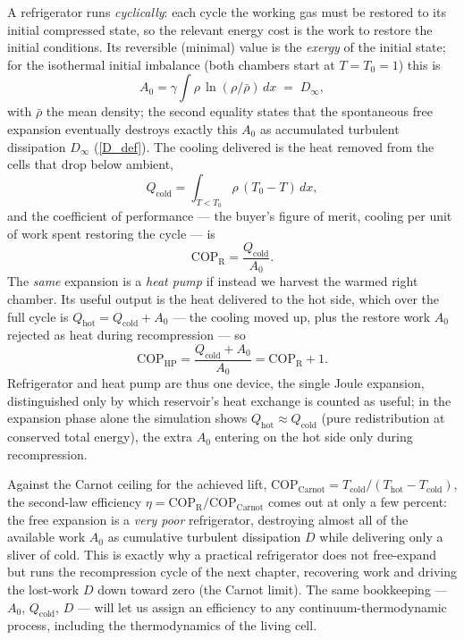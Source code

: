 A refrigerator runs \emph{cyclically}: each cycle the working gas must be
restored to its initial compressed state, so the relevant energy cost is the
work to restore the initial conditions. Its reversible (minimal) value is the
\emph{exergy} of the initial state; for the isothermal initial imbalance (both
chambers start at $T=T_0=1$) this is
\begin{equation}\label{exergyA0}
A_0=\gamma\int \rho\,\ln(\rho/\bar\rho)\,dx \;=\; D_\infty ,
\end{equation}
with $\bar\rho$ the mean density; the second equality states that the spontaneous
free expansion eventually destroys exactly this $A_0$ as accumulated turbulent
dissipation $D_\infty$ (\ref{D_def}). The cooling delivered is the heat removed from the cells
that drop below ambient,
\[
Q_{\mathrm{cold}}=\int_{T<T_0}\rho\,(T_0-T)\,dx ,
\]
and the coefficient of performance --- the buyer's figure of merit, cooling per
unit of work spent restoring the cycle --- is
\begin{equation}\label{copjoule}
\mathrm{COP}_{\mathrm R}=\frac{Q_{\mathrm{cold}}}{A_0}.
\end{equation}
The \emph{same} expansion is a \emph{heat pump} if instead we harvest the warmed
right chamber. Its useful output is the heat delivered to the hot side, which
over the full cycle is $Q_{\mathrm{hot}}=Q_{\mathrm{cold}}+A_0$ --- the cooling
moved up, plus the restore work $A_0$ rejected as heat during recompression ---
so
\[
\mathrm{COP}_{\mathrm{HP}}=\frac{Q_{\mathrm{cold}}+A_0}{A_0}=\mathrm{COP}_{\mathrm R}+1 .
\]
Refrigerator and heat pump are thus one device, the single Joule expansion,
distinguished only by which reservoir's heat exchange is counted as useful; in
the expansion phase alone the simulation shows $Q_{\mathrm{hot}}\approx
Q_{\mathrm{cold}}$ (pure redistribution at conserved total energy), the extra
$A_0$ entering on the hot side only during recompression.

Against the Carnot ceiling for the achieved lift,
$\mathrm{COP}_{\mathrm{Carnot}}=T_{\mathrm{cold}}/(T_{\mathrm{hot}}-T_{\mathrm{cold}})$,
the second-law efficiency $\eta=\mathrm{COP}_{\mathrm R}/\mathrm{COP}_{\mathrm{Carnot}}$ comes
out at only a few percent: the free expansion is a \emph{very poor} refrigerator,
destroying almost all of the available work $A_0$ as cumulative turbulent
dissipation $D$ while delivering only a sliver of cold. This is exactly why a
practical refrigerator does not free-expand but runs the recompression cycle of
the next chapter, recovering work and driving the lost-work $D$ down toward zero
(the Carnot limit). The same bookkeeping --- $A_0$, $Q_{\mathrm{cold}}$, $D$ ---
will let us assign an efficiency to any continuum-thermodynamic process,
including the thermodynamics of the living cell.

